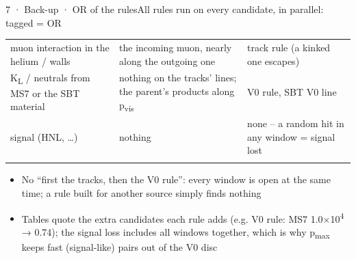 \begin{btframe}{7 · Back-up · OR of the rules}{All rules run on every candidate, in parallel: tagged = OR}
{\begin{tabularx}{\linewidth}{>{\raggedright\arraybackslash}X>{\raggedright\arraybackslash}X>{\raggedright\arraybackslash}X}
muon interaction in the helium / walls & the incoming muon, nearly along the outgoing one & track rule (a kinked one escapes) \\\rowrule
K\textsubscript{L} / neutrals from MS7 or the SBT material & nothing on the tracks' lines; the parent's products along p\textsubscript{vis} & V0 rule, SBT V0 line \\\rowrule
\rowcolor{tint}signal (HNL, …) & nothing & none -- a random hit in any window = signal lost \\\rowrule
\end{tabularx}\par}
\vspace{3pt}
{\fontsize{6.15pt}{8.60pt}\selectfont
\begin{itemize}
  \item No “first the tracks, then the V0 rule”: every window is open at the same time; a rule built for another source simply finds nothing
  \item Tables quote the extra candidates each rule adds (e.g. V0 rule: MS7 1.0×10\textsuperscript{4} → 0.74); the signal loss includes all windows together, which is why p\textsubscript{max} keeps fast (signal-like) pairs out of the V0 disc
\end{itemize}}
\end{btframe}
